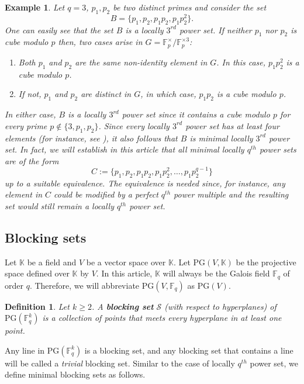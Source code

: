 \documentclass[12pt]{amsart}
\newtheorem{definition}{Definition}
\newtheorem{example}[theorem]{Example}
\newcommand{\K}{{\mathbb K}}
\newcommand{\PG}{\mathrm{PG}}
\begin{document}
\begin{example}
Let $q = 3$, $p_{1}, p_{2}$ be two distinct primes and consider the set \[ B = \{ p_{1}, p_{2}, p_{1}p_{2}, p_{1}p_{2}^{2} \}. \] One can easily see that the set $B$ is a locally $3^{rd}$ power set. If neither $p_{1}$ nor $p_{2}$ is cube modulo $p$ then, two cases arise in $G = \mathbb{F}_{p}^{\times}/\mathbb{F}_{p}^{\times 3}$:
\begin{enumerate}
    \item Both $p_{1}$ and $p_{2}$ are the same non-identity element in $G$. In this case, $p_{1}p_{2}^{2}$ is a cube modulo $p$.

    \item If not, $p_{1}$ and $p_{2}$ are distinct in $G$, in which case, $p_{1}p_{2}$ is a cube modulo $p$. 
\end{enumerate}
In either case, $B$ is a locally $3^{rd}$ power set since it contains a cube modulo $p$ for every prime $p\not\in\{3, p_{1}, p_{2}\}$. Since every locally $3^{rd}$ power set has at least four elements (for instance, see \cite[Corollary 1, pp.10]{mishra2023prime}), it also follows that $B$ is minimal locally $3^{rd}$ power set. In fact, we will establish in this article that all minimal locally $q^{th}$ power sets are of the form \[ C := \{ p_{1}, p_{2}, p_{1}p_{2}, p_{1}p_{2}^{2}, \ldots, p_{1}p_{2}^{q-1}\} \] up to a suitable equivalence. The equivalence is needed since, for instance, any element in $C$ could be modified by a perfect $q^{th}$ power multiple and the resulting set would still remain a locally $q^{th}$ power set. 
\end{example}


\subsection{Blocking sets}
Let $\K$ be a field and $V$ be a vector space over $\K$. Let $\PG(V,\K)$ be the projective space defined over $\K$ by $V$. In this article, $\K$ will always be the Galois field $\mathbb{F}_{q}$ of order $q$. Therefore, we will abbreviate $\PG(V, \mathbb{F}_{q})$ as $\PG(V)$.
\begin{definition}
Let $k \geq 2$. A \textbf{blocking set} $\mathcal{S}$ (with respect to hyperplanes) of $\PG(\mathbb{F}_{q}^{k})$ is a collection of points that meets every hyperplane in at least one point. \label{defnblocking} 
\end{definition}

Any line in $\PG(\mathbb{F}_{q}^{k})$ is a blocking set, and any blocking set that contains a line will be called a \textit{trivial} blocking set. Similar to the case of locally $q^{th}$ power set, we define minimal blocking sets as follows.
\end{document}
